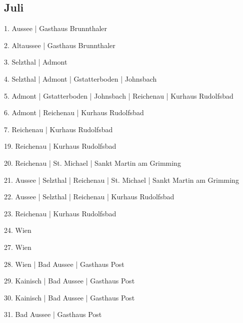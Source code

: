 \documentclass[twoside=false,titlepage=false,open=any, parskip=never, fontsize=10pt, headings=small, chapterprefix=false, appendixprefix=false, DIV=15]{scrbook}
\begin{document}
\begin{multicols}{3}
            \section*{Juli}
            1. Aussee | Gasthaus Brunnthaler\par
            2. Altaussee | Gasthaus Brunnthaler\par
            3. Selzthal | Admont\par
            4. Selzthal | Admont | Gstatterboden | Johnsbach\par
            5. Admont | Gstatterboden | Johnsbach | Reichenau | Kurhaus Rudolfsbad\par
            6. Admont | Reichenau | Kurhaus Rudolfsbad\par
            7. Reichenau | Kurhaus Rudolfsbad\par
            19. Reichenau | Kurhaus Rudolfsbad\par
            20. Reichenau | St. Michael | Sankt Martin am Grimming\par
            21. Aussee | Selzthal | Reichenau | St. Michael | Sankt Martin am Grimming\par
            22. Aussee | Selzthal | Reichenau | Kurhaus Rudolfsbad\par
            23. Reichenau | Kurhaus Rudolfsbad\par
            24. Wien\par
            27. Wien\par
            28. Wien | Bad Aussee | Gasthaus Post\par
            29. Kainisch | Bad Aussee | Gasthaus Post\par
            30. Kainisch | Bad Aussee | Gasthaus Post\par
            31. Bad Aussee | Gasthaus Post\par

\end{multicols}
\end{document}
